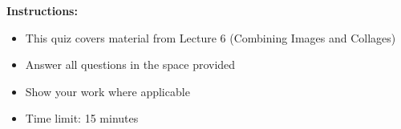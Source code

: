 \documentclass{csexam}
\begin{document}
\maketitle

\begin{rules}
\textbf{Instructions:}
\begin{itemize}
    \item This quiz covers material from Lecture 6 (Combining Images and Collages)
    \item Answer all questions in the space provided
    \item Show your work where applicable
    \item Time limit: 15 minutes
\end{itemize}
\end{rules}

\vspace{0.2in}

\showgrade

\newpage
\end{document}
